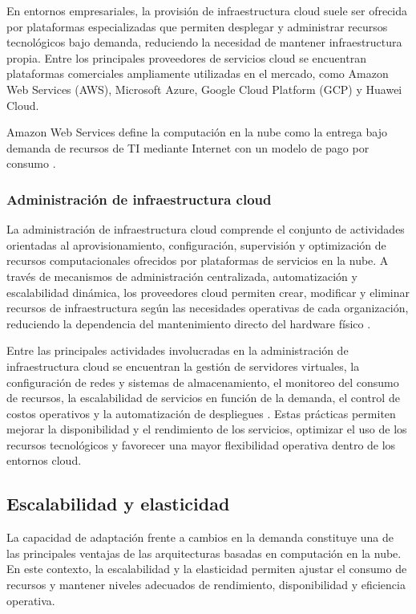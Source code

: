 En entornos empresariales, la provisión de infraestructura cloud suele ser ofrecida por plataformas especializadas que permiten desplegar y administrar recursos tecnológicos bajo demanda, reduciendo la necesidad de mantener infraestructura propia. Entre los principales proveedores de servicios cloud se encuentran plataformas comerciales ampliamente utilizadas en el mercado, como Amazon Web Services (AWS), Microsoft Azure, Google Cloud Platform (GCP) y Huawei Cloud.

Amazon Web Services define la computación en la nube como la entrega bajo demanda de recursos de TI mediante Internet con un modelo de pago por consumo \parencite{AWS2024}.

\subsubsection{Administración de infraestructura cloud}

La administración de infraestructura cloud comprende el conjunto de actividades orientadas al aprovisionamiento, configuración, supervisión y optimización de recursos computacionales ofrecidos por plataformas de servicios en la nube. A través de mecanismos de administración centralizada, automatización y escalabilidad dinámica, los proveedores cloud permiten crear, modificar y eliminar recursos de infraestructura según las necesidades operativas de cada organización, reduciendo la dependencia del mantenimiento directo del hardware físico \parencite{Mell2011, AWS2023}.

Entre las principales actividades involucradas en la administración de infraestructura cloud se encuentran la gestión de servidores virtuales, la configuración de redes y sistemas de almacenamiento, el monitoreo del consumo de recursos, la escalabilidad de servicios en función de la demanda, el control de costos operativos y la automatización de despliegues \parencite{AWS2026}. Estas prácticas permiten mejorar la disponibilidad y el rendimiento de los servicios, optimizar el uso de los recursos tecnológicos y favorecer una mayor flexibilidad operativa dentro de los entornos cloud.

\subsection{Escalabilidad y elasticidad}

La capacidad de adaptación frente a cambios en la demanda constituye una de las principales ventajas de las arquitecturas basadas en computación en la nube. En este contexto, la escalabilidad y la elasticidad permiten ajustar el consumo de recursos y mantener niveles adecuados de rendimiento, disponibilidad y eficiencia operativa.

